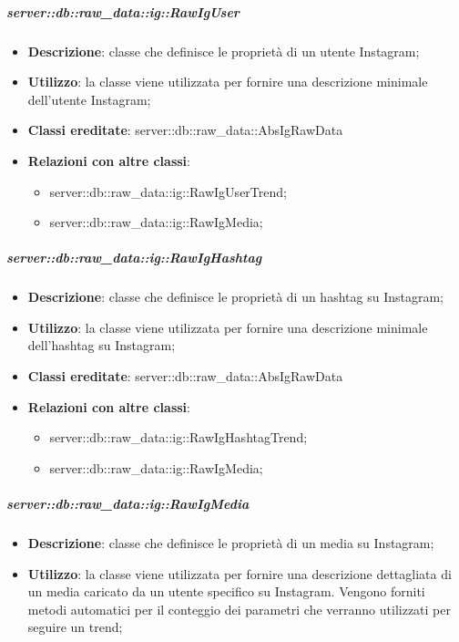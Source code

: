 		\subparagraph{server::db::raw\_data::ig::RawIgUser} %
		\label{subp:server_db_raw_data_ig_rawiguser}
			\begin{itemize}
				\item \textbf{Descrizione}: classe che definisce le proprietà di un utente Instagram;
				\item \textbf{Utilizzo}: la classe viene utilizzata per fornire una descrizione minimale dell'utente Instagram;
				\item \textbf{Classi ereditate}: server::db::raw\_data::AbsIgRawData
				\item \textbf{Relazioni con altre classi}:
					\begin{itemize}
						\item server::db::raw\_data::ig::RawIgUserTrend;
						\item server::db::raw\_data::ig::RawIgMedia;
					\end{itemize}
			\end{itemize}


		\subparagraph{server::db::raw\_data::ig::RawIgHashtag} %
		\label{subp:server_db_raw_data_ig_rawighashtag}
			\begin{itemize}
				\item \textbf{Descrizione}: classe che definisce le proprietà di un hashtag su Instagram;
				\item \textbf{Utilizzo}: la classe viene utilizzata per fornire una descrizione minimale dell'hashtag su Instagram;
				\item \textbf{Classi ereditate}: server::db::raw\_data::AbsIgRawData
				\item \textbf{Relazioni con altre classi}:
					\begin{itemize}
						\item server::db::raw\_data::ig::RawIgHashtagTrend;
						\item server::db::raw\_data::ig::RawIgMedia;
					\end{itemize}
			\end{itemize}


		\subparagraph{server::db::raw\_data::ig::RawIgMedia} %
		\label{subp:server_db_raw_data_ig_rawigmedia}
			\begin{itemize}
				\item \textbf{Descrizione}: classe che definisce le proprietà di un media su Instagram;
				\item \textbf{Utilizzo}: la classe viene utilizzata per fornire una descrizione dettagliata di un media caricato da un utente specifico su Instagram. Vengono forniti metodi automatici per il conteggio dei parametri che verranno utilizzati per seguire un trend;
			\end{itemize}


